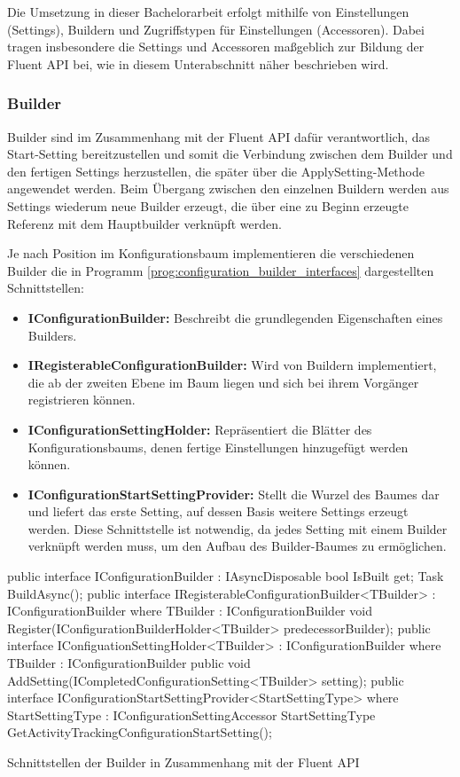 Die Umsetzung in dieser Bachelorarbeit erfolgt mithilfe von Einstellungen (Settings), Buildern und Zugriffstypen für Einstellungen (Accessoren). Dabei tragen insbesondere die Settings und Accessoren maßgeblich zur Bildung der Fluent API bei, wie in diesem Unterabschnitt näher beschrieben wird.

\subsubsection{Builder}

Builder sind im Zusammenhang mit der Fluent API dafür verantwortlich, das Start-Setting bereitzustellen und somit die Verbindung zwischen dem Builder und den fertigen Settings herzustellen, die später über die ApplySetting-Methode angewendet werden. Beim Übergang zwischen den einzelnen Buildern werden aus Settings wiederum neue Builder erzeugt, die über eine zu Beginn erzeugte Referenz mit dem Hauptbuilder verknüpft werden.

Je nach Position im Konfigurationsbaum implementieren die verschiedenen Builder die in Programm \ref{prog:configuration_builder_interfaces} dargestellten Schnittstellen:

\begin{itemize}
\item \textbf{IConfigurationBuilder:} Beschreibt die grundlegenden Eigenschaften eines Builders.
\item \textbf{IRegisterableConfigurationBuilder:} Wird von Buildern implementiert, die ab der zweiten Ebene im Baum liegen und sich bei ihrem Vorgänger registrieren können.
\item \textbf{IConfigurationSettingHolder:} Repräsentiert die Blätter des Konfigurationsbaums, denen fertige Einstellungen hinzugefügt werden können.
\item \textbf{IConfigurationStartSettingProvider:} Stellt die Wurzel des Baumes dar und liefert das erste Setting, auf dessen Basis weitere Settings erzeugt werden. Diese Schnittstelle ist notwendig, da jedes Setting mit einem Builder verknüpft werden muss, um den Aufbau des Builder-Baumes zu ermöglichen.
\end{itemize}

\begin{program}[H]
\begin{CsCode}
public interface IConfigurationBuilder : IAsyncDisposable {
    bool IsBuilt { get; }
    Task BuildAsync();
}
public interface IRegisterableConfigurationBuilder<TBuilder> : IConfigurationBuilder
    where TBuilder : IConfigurationBuilder {
    void Register(IConfigurationBuilderHolder<TBuilder> predecessorBuilder);
}
public interface IConfiguationSettingHolder<TBuilder> : IConfigurationBuilder
    where TBuilder : IConfigurationBuilder {
    public void AddSetting(ICompletedConfigurationSetting<TBuilder> setting);
}
public interface IConfigurationStartSettingProvider<StartSettingType>
    where StartSettingType : IConfigurationSettingAccessor {
    StartSettingType GetActivityTrackingConfigurationStartSetting();
}
\end{CsCode}
\caption{Schnittstellen der Builder in Zusammenhang mit der Fluent API}
\label{prog:configuration_builder_interfaces}
\end{program}

